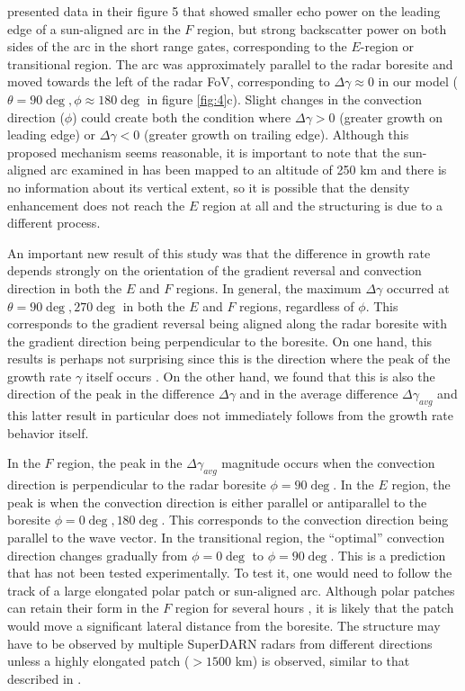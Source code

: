 \citet{Koustov2008} presented data in their figure 5 that showed smaller echo power on the leading edge of a sun-aligned arc in the \(F\) region, but strong backscatter power on both sides of the arc in the short range gates, corresponding to the \(E\)-region or transitional region.  The arc was approximately parallel to the radar boresite and moved towards the left of the radar FoV, corresponding to \(\Delta\gamma\approx 0\) in our model (\(\theta=90\deg,\phi\approx 180\deg\) in figure \ref{fig:4}c).  Slight changes in the convection direction (\(\phi\)) could create both the condition where \(\Delta\gamma>0\) (greater growth on leading edge) or \(\Delta\gamma<0\) (greater growth on trailing edge).  Although this proposed mechanism seems reasonable, it is important to note that the sun-aligned arc examined in \citet{Koustov2008} has been mapped to an altitude of 250 km and there is no information about its vertical extent, so it is possible that the density enhancement does not reach the \(E\) region at all and the structuring is due to a different process.

An important new result of this study was that the difference in growth rate depends strongly on the orientation of the gradient reversal and convection direction in both the \(E\) and \(F\) regions. In general, the maximum \(\Delta\gamma\) occurred at \(\theta=90\deg,270\deg\) in both the \(E\) and \(F\) regions, regardless of \(\phi\).  This corresponds to the gradient reversal being aligned along the radar boresite with the gradient direction being perpendicular to the boresite. On one hand, this results is perhaps not surprising since this is the direction where the peak of the growth rate \(\gamma\) itself occurs \citep{Makarevich2014c}. On the other hand, we found that this is also the direction of the peak in the difference \(\Delta\gamma\) and in the average difference \(\Delta\gamma_{avg}\) and this latter result in particular does not immediately follows from the growth rate behavior itself.

In the \(F\) region, the peak in the \(\Delta\gamma_{avg}\) magnitude occurs when the convection direction is perpendicular to the radar boresite \(\phi=90\deg\). In the \(E\) region, the peak is when the convection direction is either parallel or antiparallel to the boresite \(\phi=0\deg, 180\deg\). This corresponds to the convection direction being parallel to the wave vector. In the transitional region, the ``optimal'' convection direction changes gradually from \(\phi=0\deg\) to \(\phi=90\deg\). This is a prediction that has not been tested experimentally. To test it, one would need to follow the track of a large elongated polar patch or sun-aligned arc.  Although polar patches can retain their form in the \(F\) region for several hours \citep{Hosokawa2014}, it is likely that the patch would move a significant lateral distance from the boresite.  The structure may have to be observed by multiple SuperDARN radars from different directions unless a highly elongated patch (\(>1500\) km) is observed, similar to that described in \citet{Hosokawa2014}. 

